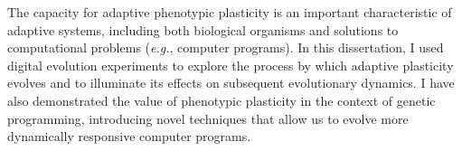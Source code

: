 

The capacity for adaptive phenotypic plasticity is an important characteristic of adaptive systems, including both biological organisms and solutions to computational problems (\textit{e.g.}, computer programs). 
In this dissertation, I used digital evolution experiments to explore the process by which adaptive plasticity evolves and to illuminate its effects on subsequent evolutionary dynamics.   
I have also demonstrated the value of phenotypic plasticity in the context of genetic programming, introducing novel techniques that allow us to evolve more dynamically responsive computer programs.